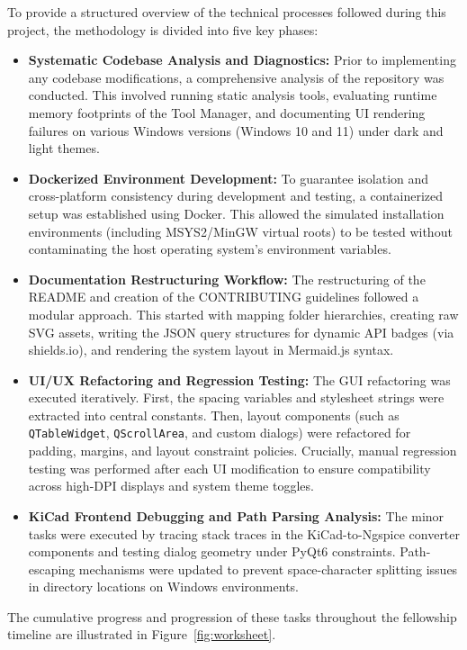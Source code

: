 \documentclass[12pt,a4paper]{report}
\begin{document}
To provide a structured overview of the technical processes followed during this project, the methodology is divided into five key phases:
\begin{itemize}
    \item \textbf{Systematic Codebase Analysis and Diagnostics:} Prior to implementing any codebase modifications, a comprehensive analysis of the repository was conducted. This involved running static analysis tools, evaluating runtime memory footprints of the Tool Manager, and documenting UI rendering failures on various Windows versions (Windows 10 and 11) under dark and light themes.
    \item \textbf{Dockerized Environment Development:} To guarantee isolation and cross-platform consistency during development and testing, a containerized setup was established using Docker. This allowed the simulated installation environments (including MSYS2/MinGW virtual roots) to be tested without contaminating the host operating system's environment variables.
    \item \textbf{Documentation Restructuring Workflow:} The restructuring of the README and creation of the CONTRIBUTING guidelines followed a modular approach. This started with mapping folder hierarchies, creating raw SVG assets, writing the JSON query structures for dynamic API badges (via shields.io), and rendering the system layout in Mermaid.js syntax.
    \item \textbf{UI/UX Refactoring and Regression Testing:} The GUI refactoring was executed iteratively. First, the spacing variables and stylesheet strings were extracted into central constants. Then, layout components (such as \texttt{QTableWidget}, \texttt{QScrollArea}, and custom dialogs) were refactored for padding, margins, and layout constraint policies. Crucially, manual regression testing was performed after each UI modification to ensure compatibility across high-DPI displays and system theme toggles.
    \item \textbf{KiCad Frontend Debugging and Path Parsing Analysis:} The minor tasks were executed by tracing stack traces in the KiCad-to-Ngspice converter components and testing dialog geometry under PyQt6 constraints. Path-escaping mechanisms were updated to prevent space-character splitting issues in directory locations on Windows environments.
\end{itemize}

The cumulative progress and progression of these tasks throughout the fellowship timeline are illustrated in Figure~\ref{fig:worksheet}.
\end{document}
